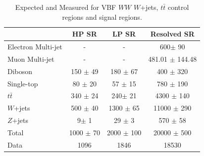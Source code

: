 \begin{table}
\begin{tabular}{|l|c|c|c|}
\hline
	  &	 HP SR &	 LP SR &	Resolved SR \\\hline 
	Electron Multi-jet &	- &	- &	600$\pm$ 90 \\\hline 
	Muon Multi-jet &	- &	- &	481.01 $\pm$ 144.48 \\\hline 
	Diboson &	150 $\pm$ 49&	180 $\pm$ 67 &	400 $\pm$ 320 \\\hline 
	Single-top &	80 $\pm$ 20 &	57 $\pm$ 15 &	780 $\pm$ 190 \\\hline 
	$t\bar{t}$ &	340 $\pm$ 24 &	240$\pm$ 21 &	4300 $\pm$ 140 \\\hline 
	$W$+jets &	500 $\pm$ 40 &	1300 $\pm$ 65 &	11000 $\pm$ 290 \\\hline 
	$Z$+jets &	9$\pm$ 1 &	29 $\pm$ 3 &	570 $\pm$ 58 \\\hline 
	Total &	1000 $\pm$ 70 &	2000 $\pm$ 100 &	20000 $\pm$ 500 \\\hline 
	Data &	1096 &	1846 &	18530 \\\hline 
\end{tabular}
\caption{Expected and Measured for VBF $WW$ $W$+jets, $t\bar{t}$ control regions and signal regions.}
\label{tbl:hvtwvbf_yields_tcr}
\end{table}

